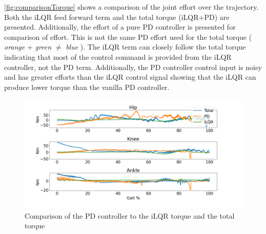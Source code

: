 \autoref{fig:comparisonTorque} shows a comparison of the joint effort over the trajectory. Both the iLQR feed forward term and the total torque (iLQR+PD) are presented. Additionally, the effort of a pure PD controller is presented for comparison of effort. This is not the same PD effort used for the total torque ( \textit{orange} +  \textit{green} $\neq$  \textit{blue} ). The iLQR term can closely follow the total torque indicating that most of the control command is provided from the iLQR controller, not the PD term. Additionally, the PD controller control input is noisy and has greater efforts than the iLQR control signal showing that the iLQR can produce lower torque than the vanilla PD controller. 

\begin{figure}
    \centering
    \includegraphics[scale=0.35]{images/controllers/torque_compare.png}
    \caption[Torque Comparison of the iLQR controller]{Comparison of the PD controller to the iLQR torque and the total torque}
    \label{fig:comparisonTorque}
\end{figure}
